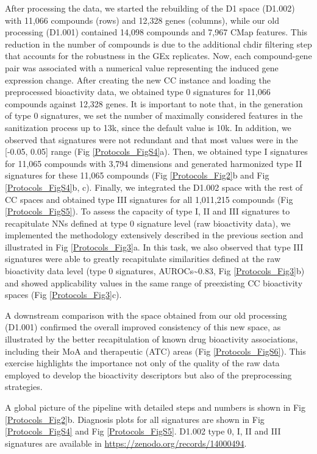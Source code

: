 After processing the data, we started the rebuilding of the D1 space (D1.002) with 11,066 compounds (rows) and 12,328 genes (columns), while our old processing (D1.001) contained 14,098 compounds and 7,967 CMap features. This reduction in the number of compounds is due to the additional chdir filtering step that accounts for the robustness in the GEx replicates. Now, each compound-gene pair was associated with a numerical value representing the induced gene expression change. After creating the new CC instance and loading the preprocessed bioactivity data, we obtained type 0 signatures for 11,066 compounds against 12,328 genes. It is important to note that, in the generation of type 0 signatures, we set the number of maximally considered features in the sanitization process up to 13k, since the default value is 10k. In addition, we observed that signatures were not redundant and that most values were in the [-0.05, 0.05] range (Fig \ref{Protocols_FigS4}a). Then, we obtained type I signatures for 11,065 compounds with 3,794 dimensions and generated harmonized type II signatures for these 11,065 compounds (Fig \ref{Protocols_Fig2}b and Fig \ref{Protocols_FigS4}b, c). Finally, we integrated the D1.002 space with the rest of CC spaces and obtained type III signatures for all 1,011,215 compounds (Fig \ref{Protocols_FigS5}). To assess the capacity of type I, II and III signatures to recapitulate NNs defined at type 0 signature level (raw bioactivity data), we implemented the methodology extensively described in the previous section and illustrated in Fig \ref{Protocols_Fig3}a. In this task, we also observed that type III signatures were able to greatly recapitulate similarities defined at the raw bioactivity data level (type 0 signatures, AUROCs\textasciitilde0.83, Fig \ref{Protocols_Fig3}b) and showed applicability values in the same range of preexisting CC bioactivity spaces (Fig \ref{Protocols_Fig3}c).

A downstream comparison with the space obtained from our old processing (D1.001) confirmed the overall improved consistency of this new space, as illustrated by the better recapitulation of known drug bioactivity associations, including their MoA and therapeutic (ATC) areas (Fig \ref{Protocols_FigS6}). This exercise highlights the importance not only of the quality of the raw data employed to develop the bioactivity descriptors but also of the preprocessing strategies.

A global picture of the pipeline with detailed steps and numbers is shown in Fig \ref{Protocols_Fig2}b. Diagnosis plots for all signatures are shown in Fig \ref{Protocols_FigS4} and Fig \ref{Protocols_FigS5}. D1.002 type 0, I, II and III signatures are available in \hyperlink{https://zenodo.org/records/14000494}{https://zenodo.org/records/14000494}. 


